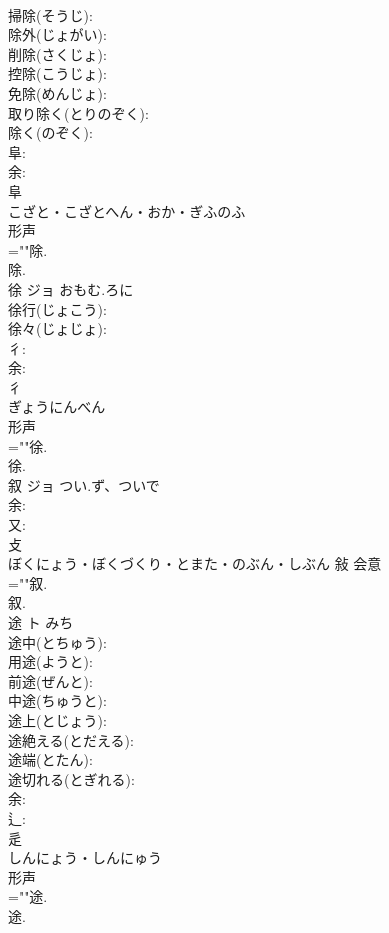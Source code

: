 \documentclass[8pt]{extreport}
\begin{document}
\begin{CJK}{UTF8}{min}
\\	掃除(そうじ): 
\\	除外(じょがい): 
\\	削除(さくじょ): 
\\	控除(こうじょ): 
\\	免除(めんじょ): 
\\	取り除く(とりのぞく): 
\\	除く(のぞく): 
\\	阜: 
\\	余: 
\\	阜	
\\	こざと・こざとへん・おか・ぎふのふ	
\\	形声 
\\	=""除.
\\	除.
\\	徐	ジョ	おもむ.ろに		
\\	徐行(じょこう): 
\\	徐々(じょじょ): 
\\	彳: 
\\	余: 
\\	彳	
\\	ぎょうにんべん	
\\	形声 
\\	=""徐.
\\	徐.
\\	叙	ジョ	つい.ず、ついで		
\\	余: 
\\	又: 
\\	攴	
\\	ぼくにょう・ぼくづくり・とまた・のぶん・しぶん	敍	会意 
\\	=""叙.
\\	叙.
\\	途	ト	みち		
\\	途中(とちゅう): 
\\	用途(ようと): 
\\	前途(ぜんと): 
\\	中途(ちゅうと): 
\\	途上(とじょう): 
\\	途絶える(とだえる): 
\\	途端(とたん): 
\\	途切れる(とぎれる): 
\\	余: 
\\	辶: 
\\	辵	
\\	しんにょう・しんにゅう	
\\	形声 
\\	=""途.
\\	途.

\end{CJK}
\end{document}
